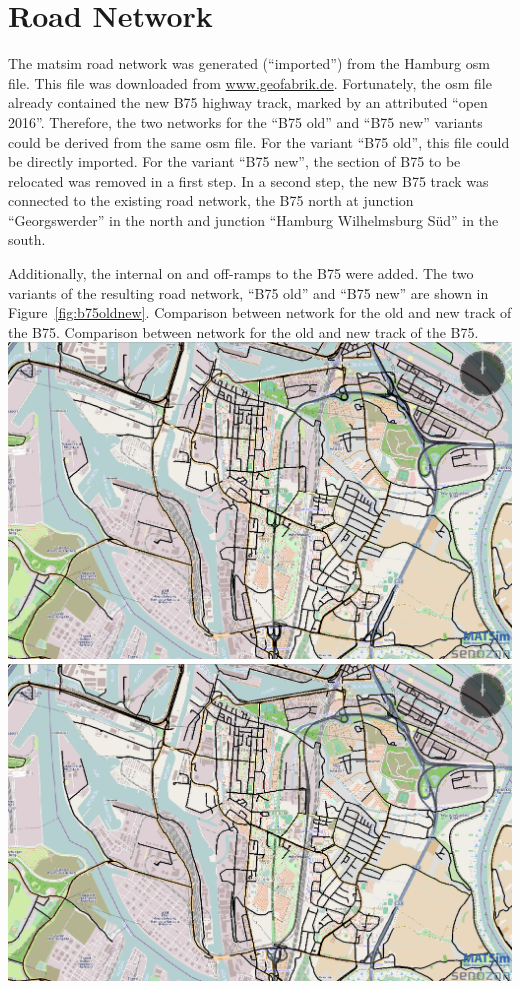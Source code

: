\section{Road Network}
The \gls{matsim} road network was generated (``imported'') from the Hamburg \gls{osm} file. This file was downloaded from \url{www.geofabrik.de}. Fortunately, the \gls{osm} file already contained the new B75 highway track, marked by an attributed ``open 2016''. Therefore, the two networks for the ``B75 old'' and ``B75 new''  variants could be derived from the same \gls{osm} file. For the variant ``B75 old'', this file could be directly imported. For the variant ``B75 new'', the section of B75 to be relocated was removed in a first step. In a second step, the new B75 track was connected to the existing road network, \ie the B75 north at junction ``Georgswerder'' in the north and junction ``Hamburg Wilhelmsburg Süd'' in the south.

Additionally, the internal on and off-ramps to the B75 were added. The two variants of the resulting road network, \ie ``B75 old'' and ``B75 new'' are shown in Figure~\ref{fig:b75oldnew}.
%
\createfigure%
{Comparison between network for the old and new track of the B75.}%
{Comparison between network for the old and new track of the B75.}%
{\label{fig:b75oldnew}}%
{%
  \createsubfigure%
  {}%
  {\includegraphics[width=.475\linewidth]{scenarios/figures/B75old}}%
  {}%
  {}%
  \createsubfigure%
  {}%
  {\includegraphics[width=.475\linewidth]{scenarios/figures/B75new}}
  {}%
  {}%
}%
  {}%

